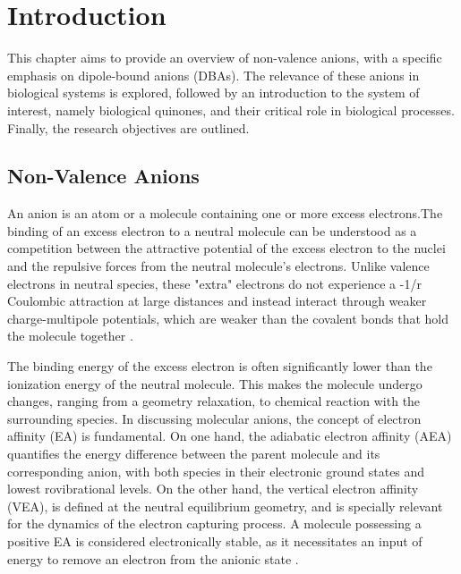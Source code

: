 \chapter{Introduction}\label{ch:introduction}

This chapter aims to provide an overview of non-valence anions, with a specific emphasis on dipole-bound anions (DBAs). The relevance of these anions in biological systems is explored, followed by an introduction to the system of interest, namely biological quinones, and their critical role in biological processes. Finally, the research objectives are outlined.

\section{Non-Valence Anions}
An anion is an atom or a molecule containing one or more excess electrons.The binding of an excess electron to a neutral molecule can be understood as a competition between the attractive potential of the excess electron to the nuclei and the repulsive forces from the neutral molecule's electrons. Unlike valence electrons in neutral species, these "extra" electrons do not experience a -1/r Coulombic attraction at large distances and instead interact through weaker charge-multipole potentials, which are weaker than the covalent bonds that hold the molecule together \cite{simons2008molecular, herbert2015quantum}.

The binding energy of the excess electron is often significantly lower than the ionization energy of the neutral molecule. This makes the molecule undergo changes, ranging from a geometry relaxation, to chemical reaction with the surrounding species.
In discussing molecular anions, the concept of electron affinity (EA) is fundamental. On one hand, the adiabatic electron affinity (AEA) quantifies the energy difference between the parent molecule and its corresponding anion, with both species in their electronic ground states and lowest rovibrational levels. On the other hand, the vertical electron affinity (VEA), is defined at the neutral equilibrium geometry, and is specially relevant for the dynamics of the electron capturing process. A molecule possessing a positive EA is considered electronically stable, as it necessitates an input of energy to remove an electron from the anionic state \cite{simons2008molecular}.

